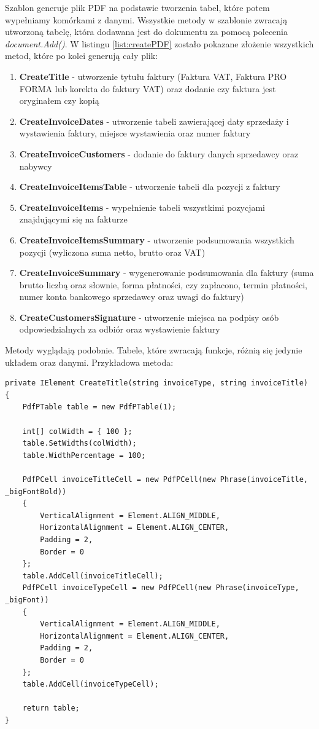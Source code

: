 Szablon generuje plik PDF na podstawie tworzenia tabel, które potem wypełniamy komórkami z danymi. Wszystkie metody w szablonie zwracają utworzoną tabelę, która dodawana jest do dokumentu za pomocą polecenia \textit{document.Add()}. W listingu \ref{list:createPDF} zostało pokazane złożenie wszystkich metod, które po kolei generują cały plik: 

\begin{enumerate}
    \item \textbf{CreateTitle} - utworzenie tytułu faktury (Faktura VAT, Faktura PRO FORMA lub korekta do faktury VAT) oraz dodanie czy faktura jest oryginałem czy kopią
    \item \textbf{CreateInvoiceDates} - utworzenie tabeli zawierającej daty sprzedaży i wystawienia faktury, miejsce wystawienia oraz numer faktury
    \item \textbf{CreateInvoiceCustomers} - dodanie do faktury danych sprzedawcy oraz nabywcy
    \item \textbf{CreateInvoiceItemsTable} - utworzenie tabeli dla pozycji z faktury
    \item \textbf{CreateInvoiceItems} - wypełnienie tabeli wszystkimi pozycjami znajdującymi się na fakturze
    \item \textbf{CreateInvoiceItemsSummary} - utworzenie podsumowania wszystkich pozycji (wyliczona suma netto, brutto oraz VAT)
    \item \textbf{CreateInvoiceSummary} - wygenerowanie podsumowania dla faktury (suma brutto liczbą oraz słownie, forma płatności, czy zapłacono, termin płatności, numer konta bankowego sprzedawcy oraz uwagi do faktury)
    \item \textbf{CreateCustomersSignature} - utworzenie miejsca na podpisy osób odpowiedzialnych za odbiór oraz wystawienie faktury
\end{enumerate}

Metody wyglądają podobnie. Tabele, które zwracają funkcje, różnią się jedynie układem oraz danymi. Przykładowa metoda:

\begin{lstlisting}[language={[Sharp]C},label=list:createTitle,caption=Metoda CreateTitle, basicstyle=\footnotesize\ttfamily]
private IElement CreateTitle(string invoiceType, string invoiceTitle)
{
    PdfPTable table = new PdfPTable(1);

    int[] colWidth = { 100 };
    table.SetWidths(colWidth);
    table.WidthPercentage = 100;

    PdfPCell invoiceTitleCell = new PdfPCell(new Phrase(invoiceTitle, _bigFontBold))
    {
        VerticalAlignment = Element.ALIGN_MIDDLE,
        HorizontalAlignment = Element.ALIGN_CENTER,
        Padding = 2,
        Border = 0
    };
    table.AddCell(invoiceTitleCell);
    PdfPCell invoiceTypeCell = new PdfPCell(new Phrase(invoiceType, _bigFont))
    {
        VerticalAlignment = Element.ALIGN_MIDDLE,
        HorizontalAlignment = Element.ALIGN_CENTER,
        Padding = 2,
        Border = 0
    };
    table.AddCell(invoiceTypeCell);

    return table;
}
\end{lstlisting}


